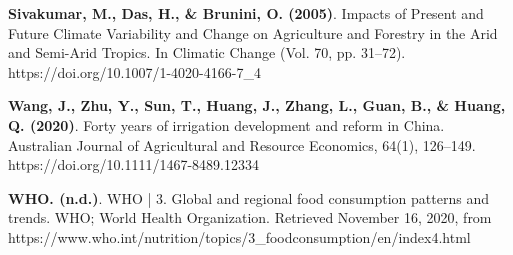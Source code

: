 \documentclass[12pt]{extarticle}
\begin{document}
\textbf{Sivakumar, M., Das, H., & Brunini, O. (2005)}. Impacts of Present and Future Climate Variability and Change on Agriculture and Forestry in the Arid and Semi-Arid Tropics. In Climatic Change (Vol. 70, pp. 31–72). https://doi.org/10.1007/1-4020-4166-7_4

\textbf{Wang, J., Zhu, Y., Sun, T., Huang, J., Zhang, L., Guan, B., & Huang, Q. (2020)}. Forty years of irrigation development and reform in China. Australian Journal of Agricultural and Resource Economics, 64(1), 126–149. https://doi.org/10.1111/1467-8489.12334

\textbf{WHO. (n.d.)}. WHO | 3. Global and regional food consumption patterns and trends. WHO; World Health Organization. Retrieved November 16, 2020, from https://www.who.int/nutrition/topics/3_foodconsumption/en/index4.html
\end{document}
